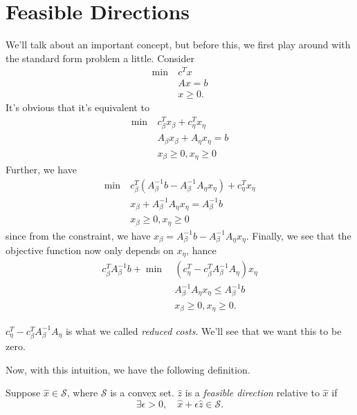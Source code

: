 \section{Feasible Directions}
We'll talk about an important concept, but before this, we first play around with the standard form problem a little. Consider
\begin{align*}
	\min~ & c^Tx     \\
	      & Ax = b   \\
	      & x\geq 0.
\end{align*}
It's obvious that it's equivalent to
\begin{align*}
	\min~ & c^{T}_{\beta}x_{\beta} + c^{T}_{\eta}x_{\eta} \\
	      & A_{\beta}x_{\beta} + A_{\eta}x_{\eta} = b     \\
	      & x_{\beta}\geq 0, x_{\eta}\geq 0
\end{align*}
Further, we have
\begin{align*}
	\min~ & c^{T}_{\beta}(A^{-1}_{\beta}b - A^{-1}_{\beta}A_{\eta}x_{\eta} ) + c_{\eta}^{T}x_{\eta} \\
	      & x_{\beta} + A^{-1}_{\beta}A_{\eta}x_{\eta} = A^{-1}_{\beta}b                            \\
	      & x_{\beta}\geq 0, x_{\eta}\geq 0
\end{align*}
since from the constraint, we have \(x_{\beta} = A^{-1}_{\beta}b - A^{-1}_{\beta}A_{\eta}x_{\eta}\). Finally, we see that the objective function now
only depends on \(x_{\eta}\), hance
\begin{align*}
	c^{T}_{\beta}A^{-1}_{\beta}b + \min~ & (c_{\eta}^{T} - c_{\beta}^{T}A^{-1}_{\beta}A_{\eta})x_{\eta} \\
	                                     & A^{-1}_{\beta}A_{\eta}x_{\eta} \leq A^{-1}_{\beta}b          \\
	                                     & x_{\beta}\geq 0, x_{\eta}\geq 0.
\end{align*}

\begin{note}
	\(c_{\eta}^{T} - c_{\beta}^{T}A^{-1}_{\beta}A_{\eta}\) is what we called \emph{reduced costs}. We'll see that we want this to be zero.
\end{note}

Now, with this intuition, we have the following definition.
\begin{definition}
	Suppose \(\hat{x}\in \mathcal{S}\), where \(\mathcal{S}\) is a convex set. \(\hat{z}\) is a \emph{feasible direction} relative to \(\hat{x}\) if
	\[
		\exists \epsilon>0,\quad \hat{x}+\epsilon \hat{z} \in \mathcal{S}.
	\]
\end{definition}

